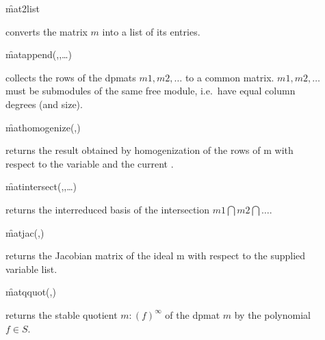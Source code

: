 \begin{description}
\item[]
  \begin{syntax}
    \f{mat2list} 
  \end{syntax}
  \hypertarget{operator:MAT2LIST}{}
converts the matrix $m$ into a list of its entries.

\item[]
  \begin{syntax}
    \f{matappend}(,,\ldots)
  \end{syntax}
  \hypertarget{operator:MATAPPEND}{}
collects the rows of the dpmats $m1,m2,\ldots $ to a common
matrix. $m1,m2,\ldots$ must be submodules of the same free module,
i.e.\ have equal column degrees (and size).

\item[]
  \begin{syntax}
    \f{mathomogenize}(,)\footnotemark
  \end{syntax}
  \hypertarget{operator:MATHOMOGENIZE}{}
returns the result obtained by homogenization of the rows of m
with respect to the variable  and the current .

\item[]
  \begin{syntax}
    \f{matintersect}(,,\ldots)
  \end{syntax}
  \hypertarget{operator:MATINTERSECT}{}
returns the interreduced basis of the intersection $m1\bigcap
m2\bigcap \ldots$.

\item[]
  \begin{syntax}
    \f{matjac}(,)
  \end{syntax}
  \hypertarget{operator:MATJAC}{}
returns the Jacobian matrix of the ideal m with respect to the
supplied variable list.

\item[]
  \begin{syntax}
    \f{matqquot}(,)
  \end{syntax}
  \hypertarget{operator:MATQQUOT}{}
returns the stable quotient $m:(f)^\infty$ of the dpmat $m$ by
the polynomial $f\in S$.


\end{description}

